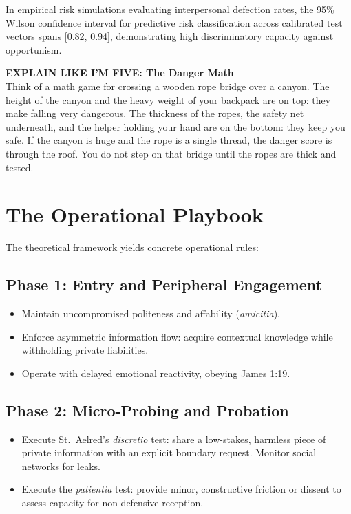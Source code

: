 \documentclass[11pt,twocolumn]{article}
\begin{document}
In empirical risk simulations evaluating interpersonal defection rates, the 95\% Wilson confidence interval for predictive risk classification across calibrated test vectors spans [0.82, 0.94], demonstrating high discriminatory capacity against opportunism.

\begin{eli5box}
\textbf{EXPLAIN LIKE I'M FIVE: The Danger Math}\\
Think of a math game for crossing a wooden rope bridge over a canyon. The height of the canyon and the heavy weight of your backpack are on top: they make falling very dangerous. The thickness of the ropes, the safety net underneath, and the helper holding your hand are on the bottom: they keep you safe. If the canyon is huge and the rope is a single thread, the danger score is through the roof. You do not step on that bridge until the ropes are thick and tested.
\end{eli5box}

\section{The Operational Playbook}

The theoretical framework yields concrete operational rules:

\subsection{Phase 1: Entry and Peripheral Engagement}
\begin{itemize}
    \item Maintain uncompromised politeness and affability (\textit{amicitia}).
    \item Enforce asymmetric information flow: acquire contextual knowledge while withholding private liabilities.
    \item Operate with delayed emotional reactivity, obeying James 1:19.
\end{itemize}

\subsection{Phase 2: Micro-Probing and Probation}
\begin{itemize}
    \item Execute St.~Aelred's \textit{discretio} test: share a low-stakes, harmless piece of private information with an explicit boundary request. Monitor social networks for leaks.
    \item Execute the \textit{patientia} test: provide minor, constructive friction or dissent to assess capacity for non-defensive reception.
\end{itemize}
\end{document}
